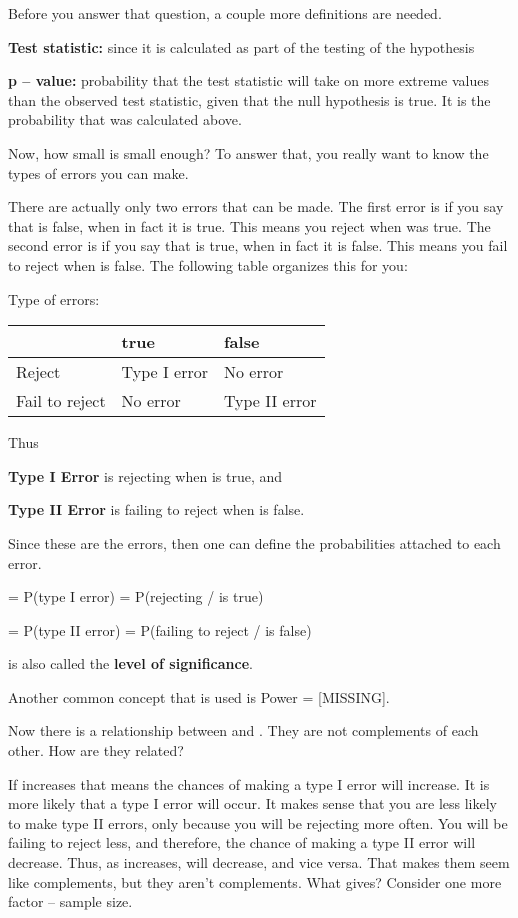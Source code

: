 \documentclass[]{book}
\begin{document}
Before you answer that question, a couple more definitions are needed.

\textbf{Test statistic:} since it is calculated as part of the testing of the hypothesis

\textbf{p -- value:} probability that the test statistic will take on more extreme values than the observed test statistic, given that the null hypothesis is true. It is the probability that was calculated above.

Now, how small is small enough? To answer that, you really want to know the types of errors you can make.

There are actually only two errors that can be made. The first error is if you say that is false, when in fact it is true. This means you reject when was true. The second error is if you say that is true, when in fact it is false. This means you fail to reject when is false. The following table organizes this for you:

Type of errors:

\begin{longtable}[]{@{}lll@{}}
\toprule
& true & false\tabularnewline
\midrule
\endhead
Reject & Type I error & No error\tabularnewline
Fail to reject & No error & Type II error\tabularnewline
\bottomrule
\end{longtable}

Thus

\textbf{Type I Error} is rejecting when is true, and

\textbf{Type II Error} is failing to reject when is false.

Since these are the errors, then one can define the probabilities
attached to each error.

= P(type I error) = P(rejecting / is true)

= P(type II error) = P(failing to reject / is false)

is also called the \textbf{level of significance}.

Another common concept that is used is Power = {[}MISSING{]}.

Now there is a relationship between and . They are not complements of each other. How are they related?

If increases that means the chances of making a type I error will increase. It is more likely that a type I error will occur. It makes sense that you are less likely to make type II errors, only because you will be rejecting more often. You will be failing to reject less, and therefore, the chance of making a type II error will decrease. Thus, as increases, will decrease, and vice versa. That makes them seem like complements, but they aren't complements. What gives? Consider one more factor -- sample size.
\end{document}
